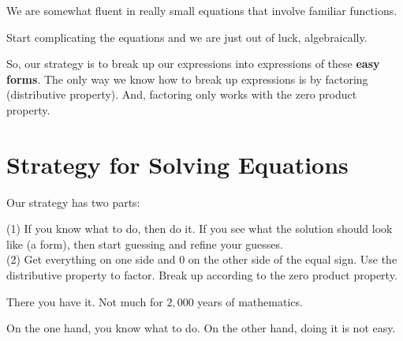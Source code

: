 \documentclass{ximera}
\begin{document}
We are somewhat fluent in really small equations that involve familiar functions.   



Start complicating the equations and we are just out of luck, algebraically. 


So, our strategy is to break up our expressions into expressions of these \textbf{\textcolor{blue!55!black}{easy forms}}.  The only way we know how to break up expressions is by factoring (distributive property).  And, factoring only works with the zero product property.















\section*{Strategy for Solving Equations}


Our strategy has two parts:


(1) If you know what to do, then do it. If you see what the solution should look like (a form), then start guessing and refine your guesses.\\
(2) Get everything on one side and $0$ on the other side of the equal sign. Use the distributive property to factor.  Break up according to the zero product property. 




There you have it. Not much for $2,000$ years of mathematics.

On the one hand, you know what to do.  On the other hand, doing it is not easy.
\end{document}
